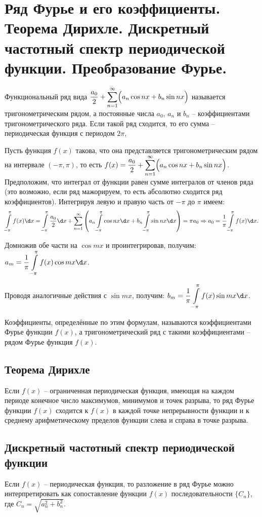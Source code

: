 \chapter{Ряд Фурье и его коэффициенты. Теорема Дирихле. Дискретный частотный
спектр периодической функции. Преобразование Фурье.}

Функциональный ряд вида \( \displaystyle \frac{a_0}{2} + \sum\limits_{n=1}^\infty
\Bigl(a_n\cos nx + b_n\sin nx\Bigr) \) называется тригонометрическим рядом, а
постоянные числа \( a_0 \), \( a_n \) и \( b_n \) -- коэффициентами
тригонометрического ряда. Если такой ряд сходится, то его сумма -- периодическая
функция с периодом \( 2\pi \),

Пусть функция \( f(x) \) такова, что она представляется тригонометрическим рядом
на интервале \( (-\pi, \pi) \), то есть \( \displaystyle f(x) = \frac{a_0}{2} +
\sum\limits_{n=1}^\infty \Bigl(a_n\cos nx + b_n\sin nx\Bigr) \). Предположим,
что интеграл от функции равен сумме интегралов от членов ряда (это возможно,
если ряд мажорируем, то есть абсолютно сходится ряд коэффициентов). Интегрируя
левую и правую часть от \( -\pi \) до \( \pi \) имеем:
\[
    \int\limits_{-\pi}^\pi f(x)\d x = \int\limits_{-\pi}^\pi \frac{a_0}{2}\d x +
    \sum\limits_{n=1}^\infty \left(a_n\int\limits_{-\pi}^\pi \cos nx\d x + b_n
    \int\limits_{-\pi}^\pi \sin nx\d x\right) = \pi a_0 \Rightarrow
    a_0 = \frac{1}{\pi}\int\limits_{-\pi}^\pi f(x) \d x.
\]

Домножив обе части на \( \cos mx \) и проинтегрировав, получим:
\( \ds a_m = \frac{1}{\pi} \int\limits_{-\pi}^\pi f(x)\cos mx\d x \).

Проводя аналогичные действия с \( \sin mx \), получим:
\( \ds b_m = \frac{1}{\pi} \int\limits_{-\pi}^\pi f(x)\sin mx \d x \).

Коэффициенты, определённые по этим формулам, называются коэффициентами Фурье
функции \( f(x) \), а тригонометрический ряд с такими коэффициентами -- рядом
Фурье функция \( f(x) \).

\section{Теорема Дирихле}
Если \( f(x) \) -- ограниченная периодическая функция, имеющая на каждом периоде
конечное число максимумов, минимумов и точек разрыва, то ряд Фурье функции
\( f(x) \) сходится к \( f(x) \) в каждой точке непрерывности функции и к
среднему арифметическому пределов функции слева и справа в точке разрыва.

\section{Дискретный частотный спектр периодической функции}
Если \( f(x) \) -- периодическая функция, то разложение в ряд Фурье можно
интерпретировать как сопоставление функции \( f(x) \) последовательности
\( \bigl\{ C_n \bigr\} \), где \( C_n = \sqrt{a_n^2 + b_n^2} \).

